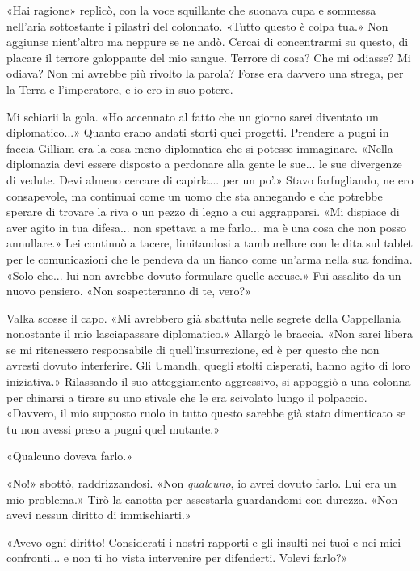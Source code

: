 «Hai ragione» replicò, con la voce squillante che suonava cupa e
sommessa nell'aria sottostante i pilastri del colonnato. «Tutto questo è
colpa tua.» Non aggiunse nient'altro ma neppure se ne andò. Cercai di
concentrarmi su questo, di placare il terrore galoppante del mio sangue.
Terrore di cosa? Che mi odiasse? Mi odiava? Non mi avrebbe più rivolto
la parola? Forse era davvero una strega, per la Terra e l'imperatore, e
io ero in suo potere.

Mi schiarii la gola. «Ho accennato al fatto che un giorno sarei
diventato un diplomatico...» Quanto erano andati storti quei progetti.
Prendere a pugni in faccia Gilliam era la cosa meno diplomatica che si
potesse immaginare. «Nella diplomazia devi essere disposto a perdonare
alla gente le sue... le sue divergenze di vedute. Devi almeno cercare di
capirla... per un po'.» Stavo farfugliando, ne ero consapevole, ma
continuai come un uomo che sta annegando e che potrebbe sperare di
trovare la riva o un pezzo di legno a cui aggrapparsi. «Mi dispiace di
aver agito in tua difesa... non spettava a me farlo... ma è una cosa che
non posso annullare.» Lei continuò a tacere, limitandosi a tamburellare
con le dita sul tablet per le comunicazioni che le pendeva da un fianco
come un'arma nella sua fondina. «Solo che... lui non avrebbe dovuto
formulare quelle accuse.» Fui assalito da un nuovo pensiero. «Non
sospetteranno di te, vero?»

Valka scosse il capo. «Mi avrebbero già sbattuta nelle segrete della
Cappellania nonostante il mio lasciapassare diplomatico.» Allargò le
braccia. «Non sarei libera se mi ritenessero responsabile di
quell'insurrezione, ed è per questo che non avresti dovuto interferire.
Gli Umandh, quegli stolti disperati, hanno agito di loro iniziativa.»
Rilassando il suo atteggiamento aggressivo, si appoggiò a una colonna
per chinarsi a tirare su uno stivale che le era scivolato lungo il
polpaccio. «Davvero, il mio supposto ruolo in tutto questo sarebbe già
stato dimenticato se tu non avessi preso a pugni quel mutante.»

«Qualcuno doveva farlo.»

«No!» sbottò, raddrizzandosi. «Non \emph{qualcuno}, io avrei dovuto
farlo. Lui era un mio problema.» Tirò la canotta per assestarla
guardandomi con durezza. «Non avevi nessun diritto di immischiarti.»

«Avevo ogni diritto! Considerati i nostri rapporti e gli insulti nei
tuoi e nei miei confronti... e non ti ho vista intervenire per
difenderti. Volevi farlo?»

